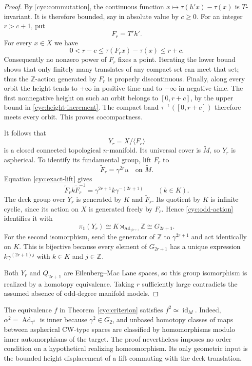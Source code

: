 \begin{proof}
By \eqref{cyc:commutation}, the continuous function
$x\mapsto\tau(h'x)-\tau(x)$ is $T$-invariant.  It is therefore
bounded, say in absolute value by $c\geq0$.  For an integer $r>c+1$,
put
\[
 F_r=T^rh'.
\]
For every $x\in X$ we have
\begin{equation}\label{cyc:height-increment}
 0<r-c\leq\tau(F_rx)-\tau(x)\leq r+c.
\end{equation}
Consequently no nonzero power of $F_r$ fixes a point.  Iterating the
lower bound shows that only finitely many translates of any compact
set can meet that set; thus the $\mathbb Z$-action generated by $F_r$
is properly discontinuous.  Finally, along every orbit the height
tends to $+\infty$ in positive time and to $-\infty$ in negative
time.  The first nonnegative height on such an orbit belongs to
$[0,r+c]$, by the upper bound in \eqref{cyc:height-increment}.
The compact band $\tau^{-1}([0,r+c])$ therefore meets every orbit.
This proves cocompactness.

It follows that
\[
 Y_r=X/\langle F_r\rangle
\]
is a closed connected topological $n$-manifold.  Its universal cover
is $\widetilde M$, so $Y_r$ is aspherical.  To identify its fundamental
group, lift $F_r$ to
\[
 \widetilde F_r=\gamma^{2r}u
 \quad\text{on }\widetilde M.
\]
Equation \eqref{cyc:exact-lift} gives
\begin{equation}\label{cyc:odd-action}
 \widetilde F_r k\widetilde F_r^{-1}
   =\gamma^{2r+1}k\gamma^{-(2r+1)}
 \qquad(k\in K).
\end{equation}
The deck group over $Y_r$ is generated by $K$ and $\widetilde F_r$.
Its quotient by $K$ is infinite cyclic, since its action on $X$ is
generated freely by $F_r$.  Hence \eqref{cyc:odd-action} identifies it
with
\[
 \pi_1(Y_r)
   \cong K\rtimes_{\operatorname{Ad}_{\gamma^{2r+1}}}\mathbb Z
   \cong G_{2r+1}.
\]
For the second isomorphism, send the generator of $\mathbb Z$ to
$\gamma^{2r+1}$ and act identically on $K$.  This is bijective because
every element of $G_{2r+1}$ has a unique expression
$k\gamma^{(2r+1)j}$ with $k\in K$ and $j\in\mathbb Z$.

Both $Y_r$ and $Q_{2r+1}$ are Eilenberg--Mac Lane spaces, so this
group isomorphism is realized by a homotopy equivalence.  Taking $r$
sufficiently large contradicts the assumed absence of odd-degree
manifold models.
\end{proof}

\begin{remark}\label{cyc:homotopy-involution}
The equivalence $f$ in Theorem~\ref{cyc:criterion} satisfies
$f^2\simeq\operatorname{id}_M$.  Indeed,
$\alpha^2=\operatorname{Ad}_{\gamma^2}$ is inner because
$\gamma^2\in G_2$, and unbased
homotopy classes of maps between aspherical CW-type spaces are
classified by homomorphisms modulo inner automorphisms of the target.
The proof nevertheless imposes no order condition on a hypothetical
realizing homeomorphism.  Its only geometric input is the bounded
height displacement of a lift commuting with the deck translation.
\end{remark}

